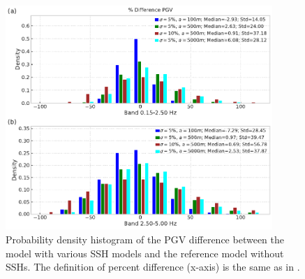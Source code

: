 \begin{figure}[!ht]
  \centering
  \includegraphics[width=0.9\textwidth,height=0.9\textheight,keepaspectratio]{figures/figure_highf_S2.pdf}
  \caption{Probability density histogram of the PGV difference between the model with various SSH models and the reference model without SSHs. The definition of percent difference (x-axis) is the same as in .
  }
  \label{fig:highf-S2}
\end{figure}
\clearpage

